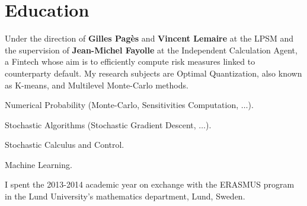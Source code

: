 \documentclass[]{deedy-resume-openfont}
\begin{document}
\begin{minipage}[t]{0.64\textwidth} 



\section{Education}

Under the direction of \textbf{Gilles Pagès} and \textbf{Vincent Lemaire} at the LPSM and the supervision of \textbf{Jean-Michel Fayolle} at the Independent Calculation Agent, a Fintech whose aim is to efficiently compute risk measures linked to counterparty default. My research subjects are Optimal Quantization, also known as K-means, and Multilevel Monte-Carlo methods.
\sectionsep


\vspace{\topsep}
\begin{tightemize}
	\item Numerical Probability (Monte-Carlo, Sensitivities Computation, $\dots$).
	\item Stochastic Algorithms (Stochastic Gradient Descent, $\dots$).
	\item Stochastic Calculus and Control.
	\item Machine Learning.
\end{tightemize}
\sectionsep


I spent the 2013-2014 academic year on exchange with the ERASMUS program in the Lund University's mathematics department, Lund, Sweden.





\end{minipage}
\end{document}
